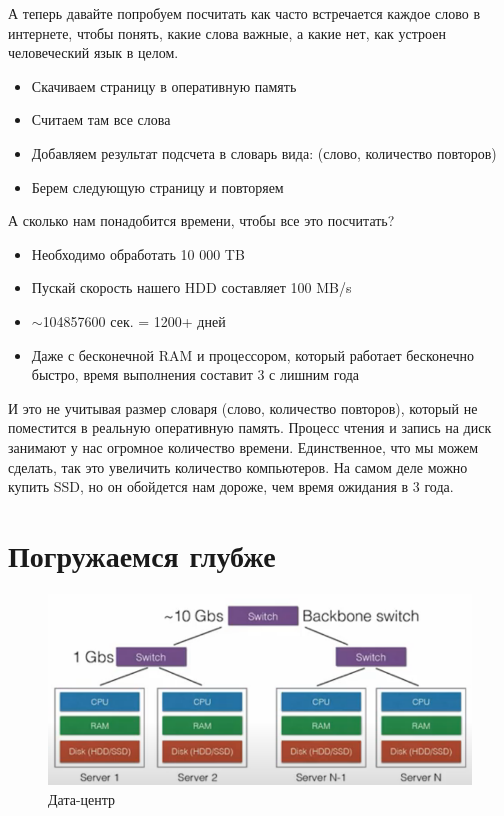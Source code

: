\documentclass{article}
\begin{document}
А теперь давайте попробуем посчитать как часто встречается каждое слово в интернете, чтобы понять, какие слова важные, а какие нет, как устроен человеческий язык в целом.

\begin{itemize}
    \item Скачиваем страницу в оперативную память
    \item Считаем там все слова
    \item Добавляем результат подсчета в словарь вида: (слово, количество повторов)
    \item Берем следующую страницу и повторяем
\end{itemize}

А сколько нам понадобится времени, чтобы все это посчитать?

\begin{itemize}
    \item Необходимо обработать 10 000 TB
    \item Пускай скорость нашего HDD составляет 100 MB/s
    \item $\sim $104857600 сек. = 1200+ дней
    \item Даже с бесконечной RAM и процессором, который работает бесконечно быстро, время выполнения составит 3 с лишним года
\end{itemize}

И это не учитывая размер словаря (слово, количество повторов), который не поместится в реальную оперативную память. Процесс чтения и запись на диск занимают у нас огромное количество времени. Единственное, что мы можем сделать, так это увеличить количество компьютеров. На самом деле можно купить SSD, но он обойдется нам дороже, чем время ожидания в 3 года.

\section{Погружаемся глубже}


\begin{figure}[h]
\centering
\includegraphics[width=1\textwidth]{parallelisation.png}
\caption{Дата-центр}
\end{figure}
\end{document}
